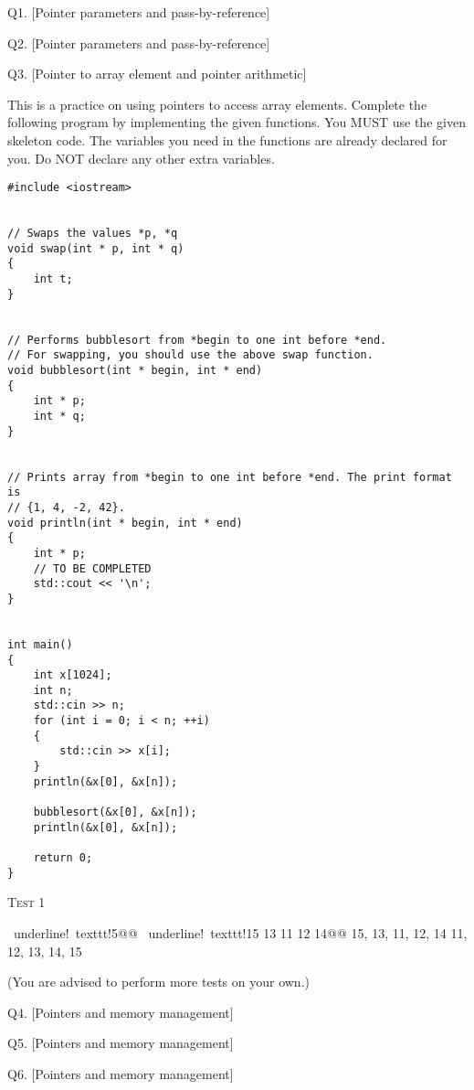 \newpage Q1. [Pointer parameters and pass-by-reference]



\newpage Q2. [Pointer parameters and pass-by-reference]



\newpage Q3. [Pointer to array element and pointer arithmetic]

This is a practice on using pointers to access array elements.
Complete the following program by implementing the given functions.
You MUST use the given skeleton code.
The variables you need in the functions are already declared for you.
Do NOT declare any other extra variables.

\begin{Verbatim}[frame=single,commandchars=\~\!\@]
#include <iostream>


// Swaps the values *p, *q
void swap(int * p, int * q)
{
    int t;
}


// Performs bubblesort from *begin to one int before *end.
// For swapping, you should use the above swap function.
void bubblesort(int * begin, int * end)
{
    int * p;
    int * q;
}


// Prints array from *begin to one int before *end. The print format is
// {1, 4, -2, 42}.
void println(int * begin, int * end)
{
    int * p;
    // TO BE COMPLETED
    std::cout << '\n';
}


int main()
{
    int x[1024];
    int n;
    std::cin >> n;
    for (int i = 0; i < n; ++i)
    {
        std::cin >> x[i];
    }
    println(&x[0], &x[n]);
    
    bubblesort(&x[0], &x[n]);
    println(&x[0], &x[n]);
    
    return 0;
}
\end{Verbatim}

\textsc{Test 1}
\begin{console}[commandchars=\~\!\@]
~underline!~texttt!5@@
~underline!~texttt!15 13 11 12 14@@
{15, 13, 11, 12, 14}
{11, 12, 13, 14, 15}
\end{console}
(You are advised to perform more tests on your own.)

\newpage Q4. [Pointers and memory management]
%
 

\newpage Q5. [Pointers and memory management]





\newpage Q6. [Pointers and memory management]





